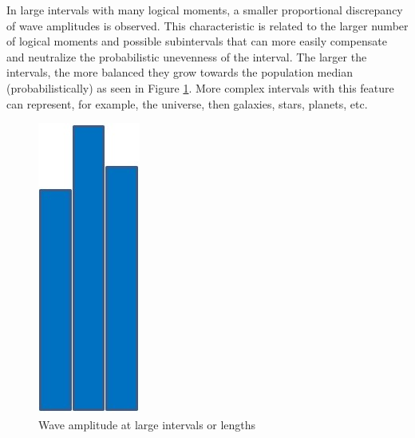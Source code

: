 In large intervals with many logical moments, a smaller proportional discrepancy of wave amplitudes is observed. This characteristic is related to the larger number of logical moments and possible subintervals that can more easily compensate and neutralize the probabilistic unevenness of the interval. The larger the intervals, the more balanced they grow towards the population median (probabilistically) as seen in Figure \ref{fig:consciousness_space_subconsciousness}. More complex intervals with this feature can represent, for example, the universe, then galaxies, stars, planets, etc.
	\begin{figure}[H]
	\caption{Wave amplitude at large intervals or lengths}
	\label{fig:consciousness_space_subconsciousness}
	\centering
	\includegraphics[scale=.45]{sections/images/consciousness_space_subconsciousness.jpg}
	\end{figure}

